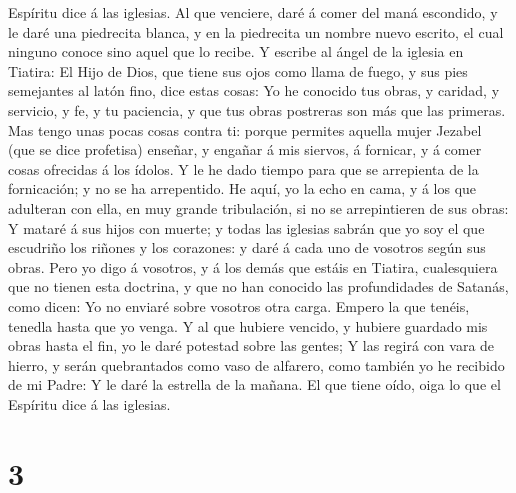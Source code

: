 Espíritu dice á las iglesias. Al que venciere, daré á comer del maná
escondido, y le daré una piedrecita blanca, y en la piedrecita un nombre
nuevo escrito, el cual ninguno conoce sino aquel que lo recibe.
 Y escribe al ángel de la iglesia en Tiatira: El Hijo de
Dios, que tiene sus ojos como llama de fuego, y sus pies semejantes al
latón fino, dice estas cosas:  Yo he conocido tus obras,
y caridad, y servicio, y fe, y tu paciencia, y que tus obras postreras
son más que las primeras.  Mas tengo unas pocas cosas
contra ti: porque permites aquella mujer Jezabel (que se dice profetisa)
enseñar, y engañar á mis siervos, á fornicar, y á comer cosas ofrecidas
á los ídolos.  Y le he dado tiempo para que se arrepienta
de la fornicación; y no se ha arrepentido.  He aquí, yo
la echo en cama, y á los que adulteran con ella, en muy grande
tribulación, si no se arrepintieren de sus obras:  Y
mataré á sus hijos con muerte; y todas las iglesias sabrán que yo soy el
que escudriño los riñones y los corazones: y daré á cada uno de vosotros
según sus obras.  Pero yo digo á vosotros, y á los demás
que estáis en Tiatira, cualesquiera que no tienen esta doctrina, y que
no han conocido las profundidades de Satanás, como dicen: Yo no enviaré
sobre vosotros otra carga.  Empero la que tenéis, tenedla
hasta que yo venga.  Y al que hubiere vencido, y hubiere
guardado mis obras hasta el fin, yo le daré potestad sobre las gentes;
 Y las regirá con vara de hierro, y serán quebrantados
como vaso de alfarero, como también yo he recibido de mi Padre:
 Y le daré la estrella de la mañana.  El
que tiene oído, oiga lo que el Espíritu dice á las iglesias.

\hypertarget{section-2}{%
\section{3}\label{section-2}}

